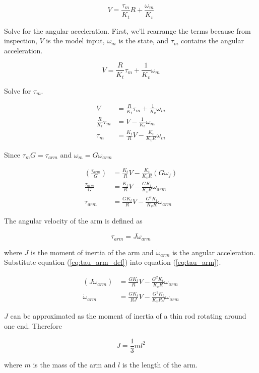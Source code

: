 \begin{equation*}
  V = \frac{\tau_m}{K_t} R + \frac{\omega_m}{K_v}
\end{equation*}

Solve for the angular acceleration. First, we'll rearrange the terms because
from inspection, $V$ is the \gls{model} \gls{input}, $\omega_m$ is the
\gls{state}, and $\tau_m$ contains the angular acceleration.

\begin{equation*}
  V = \frac{R}{K_t} \tau_m + \frac{1}{K_v} \omega_m
\end{equation*}

Solve for $\tau_m$.

\begin{align*}
  V &= \frac{R}{K_t} \tau_m + \frac{1}{K_v} \omega_m \\
  \frac{R}{K_t} \tau_m &= V - \frac{1}{K_v} \omega_m \\
  \tau_m &= \frac{K_t}{R} V - \frac{K_t}{K_v R} \omega_m
\end{align*}

Since $\tau_m G = \tau_{arm}$ and $\omega_m = G \omega_{arm}$

\begin{align}
  \left(\frac{\tau_{arm}}{G}\right) &= \frac{K_t}{R} V -
    \frac{K_t}{K_v R} (G \omega_f) \nonumber \\
  \frac{\tau_{arm}}{G} &= \frac{K_t}{R} V - \frac{G K_t}{K_v R} \omega_{arm}
    \nonumber \\
  \tau_{arm} &= \frac{G K_t}{R} V - \frac{G^2 K_t}{K_v R} \omega_{arm}
    \label{eq:tau_arm}
\end{align}

The angular velocity of the arm is defined as

\begin{equation}
  \tau_{arm} = J \dot{\omega}_{arm} \label{eq:tau_arm_def}
\end{equation}

where $J$ is the moment of inertia of the arm and $\dot{\omega}_{arm}$ is the
angular acceleration. Substitute equation (\ref{eq:tau_arm_def}) into equation
(\ref{eq:tau_arm}).

\begin{align}
  (J \dot{\omega}_{arm}) &= \frac{G K_t}{R} V - \frac{G^2 K_t}{K_v R}
    \omega_{arm} \nonumber \\
  \dot{\omega}_{arm} &= \frac{G K_t}{RJ} V - \frac{G^2 K_t}{K_v RJ} \omega_{arm}
    \label{eq:dot_omega_arm}
\end{align}

$J$ can be approximated as the moment of inertia of a thin rod rotating around
one end. Therefore

\begin{equation}
  J = \frac{1}{3}ml^2
\end{equation}

where $m$ is the mass of the arm and $l$ is the length of the arm.
